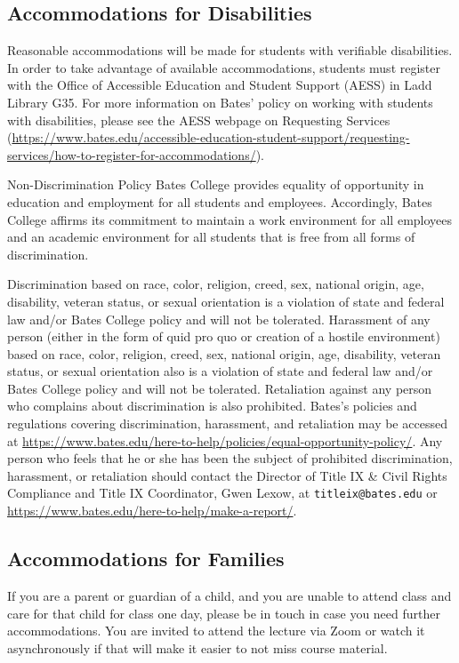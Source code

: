 \documentclass[11pt]{article}
\begin{document}
\subsection*{Accommodations for Disabilities}
\footnotesize{Reasonable accommodations will be made for students with verifiable disabilities. In order to take advantage of available accommodations, students must register with the Office of Accessible Education and Student Support (AESS) in Ladd Library G35. For more information on Bates' policy on working with students with disabilities, please see the AESS webpage on Requesting Services (\url{https://www.bates.edu/accessible-education-student-support/requesting-services/how-to-register-for-accommodations/}).}

\footnotesize{Non-Discrimination Policy Bates College provides equality of opportunity in education and employment for all students and employees. Accordingly, Bates College affirms its commitment to maintain a work environment for all employees and an academic environment for all students that is free from all forms of discrimination.}

\footnotesize{Discrimination based on race, color, religion, creed, sex, national origin, age, disability, veteran status, or sexual orientation is a violation of state and federal law and/or Bates College policy and will not be tolerated. Harassment of any person (either in the form of quid pro quo or creation of a hostile environment) based on race, color, religion, creed, sex, national origin, age, disability, veteran status, or sexual orientation also is a violation of state and federal law and/or Bates College policy and will not be tolerated. Retaliation against any person who complains about discrimination is also prohibited. Bates's policies and regulations covering discrimination, harassment, and retaliation may be accessed at \url{https://www.bates.edu/here-to-help/policies/equal-opportunity-policy/}. Any person who feels that he or she has been the subject of prohibited discrimination, harassment, or retaliation should contact the Director of Title IX \& Civil Rights Compliance and Title IX Coordinator, Gwen Lexow, at \texttt{titleix@bates.edu} or \url{https://www.bates.edu/here-to-help/make-a-report/}.}

\subsection*{Accommodations for Families}

\footnotesize{If you are a parent or guardian of a child, and you are unable to attend class and care for that child for class one day, please be in touch in case you need further accommodations. You are invited to attend the lecture via Zoom or watch it asynchronously if that will make it easier to not miss course material.}
\end{document}
